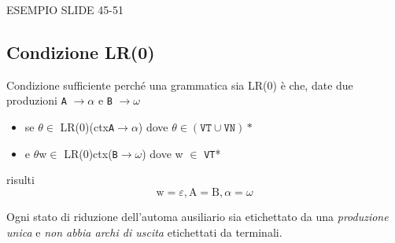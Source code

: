 ESEMPIO SLIDE 45-51

\subsection{Condizione LR(0)}
\begin{mdframed}[topline=false,bottomline=false,rightline=false]
Condizione sufficiente perché una grammatica sia LR(0) è che, date due produzioni \texttt{A} $\rightarrow \alpha$ e \texttt{B} $\rightarrow \omega$
\begin{itemize}
    \item se $\theta \in$ LR(0)(ctx\texttt{A}$ \rightarrow \alpha$) dove $\theta \in (\texttt{VT} \cup \texttt{VN})*$
    \item e $\theta $w$ \in$ LR(0)ctx(\texttt{B}$ \rightarrow \omega$) dove w $\in$ \texttt{VT}*
\end{itemize}
risulti
\begin{equation*}
    \text{w} = \varepsilon, \text{A} = \text{B}, \alpha = \omega
\end{equation*}

Ogni stato di riduzione dell'automa ausiliario sia etichettato da una \textit{produzione unica} e \textit{non abbia archi di uscita} etichettati da terminali.
\end{mdframed}





































































